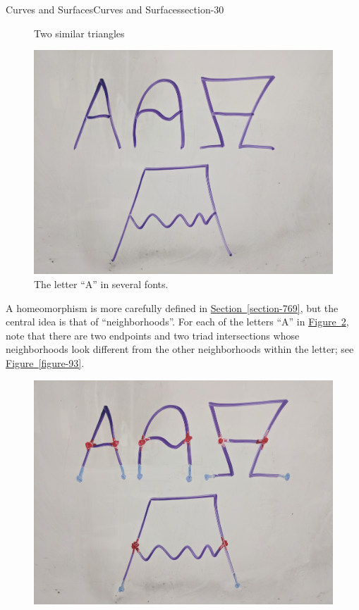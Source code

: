 \documentclass[oneside,10pt,]{article}
\begin{document}
\begin{sectionptx}{Curves and Surfaces}{}{Curves and Surfaces}{}{}{section-30}
\begin{figure}
\caption{Two similar triangles\label{figure-80}}
\end{figure}
\begin{figure}
\centering
\includegraphics[width=1\linewidth]{images/letter-a.jpg}
\caption{The letter ``A'' in several fonts.\label{figure-83}}
\end{figure}
\hypertarget{p-87}{}%
A homeomorphism is more carefully defined in \hyperref[section-769]{Section~\ref{section-769}}, but the central idea is that of ``neighborhoods''. For each of the letters ``A'' in \hyperref[figure-83]{Figure~\ref{figure-83}}, note that there are two endpoints and two triad intersections whose neighborhoods look different from the other neighborhoods within the letter; see \hyperref[figure-93]{Figure~\ref{figure-93}}.%
\begin{figure}
\centering
\includegraphics[width=1\linewidth]{images/letter-a-neighborhoods.jpg}

\end{figure}
\end{sectionptx}
\end{document}
